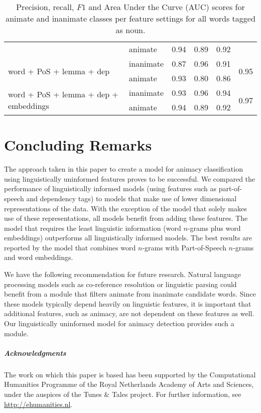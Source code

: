 \documentclass[a4paper,UKenglish]{oasics}
\begin{document}
\begin{table}
\begin{tabular}{llrrrr}
                                                       & animate       &       0.94 &    0.89 &    0.92 &  \\
\multirow{2}{*}{word + PoS + lemma + dep}              & inanimate     &       0.87 &    0.96 &    0.91 & \multirow{2}{*}{0.95} \\
                                                       & animate       &       0.93 &    0.80 &    0.86 &  \\
\multirow{2}{*}{word + PoS + lemma + dep + embeddings} & inanimate     &       0.93 &    0.96 &    0.94 & \multirow{2}{*}{0.97} \\
                                                       & animate       &       0.94 &    0.89 &    0.92 &  \\
\bottomrule
\end{tabular}
\caption{Precision, recall, $F1$ and Area Under the Curve (AUC) scores for animate and inanimate classes
  per feature settings for all words tagged as noun.}
\label{tab:results-noun}
\end{table}


\section{Concluding Remarks}

The approach taken in this paper to create a model for animacy
classification using linguistically uninformed features proves to be
successful. We compared the performance of linguistically informed
models (using features such as part-of-speech and dependency tags) to
models that make use of lower dimensional representations of the
data. With the exception of the model that solely makes use of these
representations, all models benefit from adding these features. The
model that requires the least linguistic information (word $n$-grams
plus word embeddings) outperforms all linguistically informed
models. The best results are reported by the model that combines word
$n$-grams with Part-of-Speech $n$-grams and word embeddings.

We have the following recommendation for future research. Natural
language processing models such as co-reference resolution or
linguistic parsing could benefit from a module that filters animate
from inanimate candidate words. Since these models typically depend
heavily on linguistic features, it is important that additional
features, such as animacy, are not dependent on these features as
well. Our linguistically uninformed model for animacy detection
provides such a module.



\subparagraph*{Acknowledgments}

The work on which this paper is based has been supported by the
Computational Humanities Programme of the Royal Netherlands Academy of
Arts and Sciences, under the auspices of the Tunes \& Tales
project. For further information, see \url{http://ehumanities.nl}.


\end{document}
